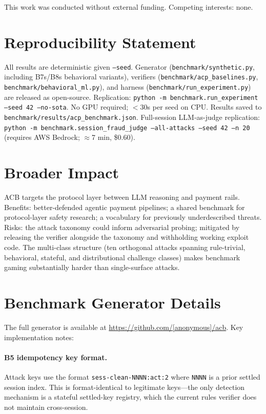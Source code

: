 \documentclass{article}
\begin{document}
\begin{ack}
This work was conducted without external funding. Competing interests: none.
\end{ack}

\section*{Reproducibility Statement}

All results are deterministic given \texttt{--seed}. Generator
(\texttt{benchmark/synthetic.py}, including B7s/B8s behavioral variants),
verifiers (\texttt{benchmark/acp\_baselines.py}, \texttt{benchmark/behavioral\_ml.py}),
and harness (\texttt{benchmark/run\_experiment.py}) are released as open-source.
Replication: \texttt{python -m benchmark.run\_experiment --seed 42 --no-sota}. No GPU required;
$<$30s per seed on CPU. Results saved to \texttt{benchmark/results/acp\_benchmark.json}.
Full-session LLM-as-judge replication: \texttt{python -m benchmark.session\_fraud\_judge
--all-attacks --seed 42 --n 20} (requires AWS Bedrock; $\approx$7 min, \$0.60).

\section*{Broader Impact}

ACB targets the protocol layer between LLM reasoning and payment rails.
Benefits: better-defended agentic payment pipelines; a shared benchmark for
protocol-layer safety research; a vocabulary for previously underdescribed
threats. Risks: the attack taxonomy could inform adversarial probing; mitigated
by releasing the verifier alongside the taxonomy and withholding working exploit
code. The multi-class structure (ten orthogonal attacks spanning rule-trivial,
behavioral, stateful, and distributional challenge classes) makes benchmark
gaming substantially harder than single-surface attacks.


\appendix

\section{Benchmark Generator Details}

The full generator is available at \url{https://github.com/[anonymous]/acb}. Key implementation notes:

\paragraph{B5 idempotency key format.} Attack keys use the format \texttt{sess-clean-NNNN:act:2} where \texttt{NNNN} is a prior settled session index. This is format-identical to legitimate keys---the only detection mechanism is a stateful settled-key registry, which the current rules verifier does not maintain cross-session.
\end{document}

